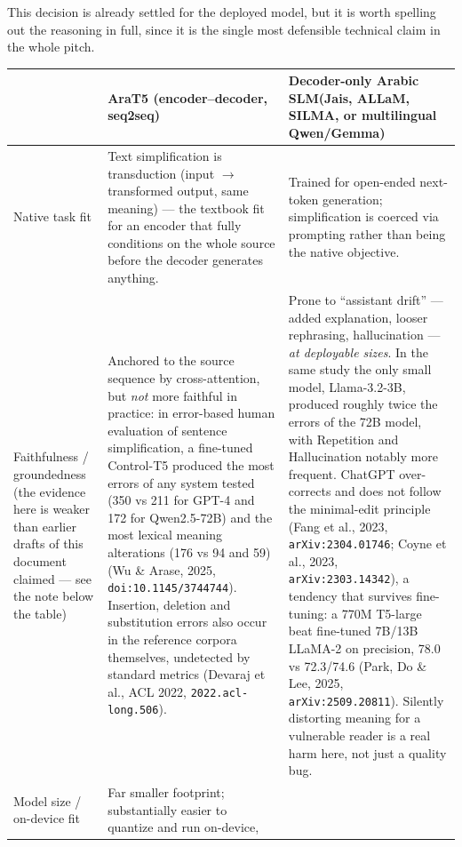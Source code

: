 \documentclass[11pt,a4paper]{article}
\begin{document}
This decision is already settled for the deployed model, but it is worth spelling
out the reasoning in full, since it is the single most defensible technical claim
in the whole pitch.

\begin{center}
\begin{tabular}{@{}p{4.6cm}p{5.6cm}p{5.6cm}@{}}
\toprule
& \textbf{AraT5 (encoder--decoder, seq2seq)} & \textbf{Decoder-only Arabic SLM}\newline\footnotesize(Jais, ALLaM, SILMA, or multilingual Qwen/Gemma) \\
\midrule
Native task fit &
Text simplification is transduction (input $\to$ transformed output, same
meaning) --- the textbook fit for an encoder that fully conditions on the
whole source before the decoder generates anything. &
Trained for open-ended next-token generation; simplification is coerced via
prompting rather than being the native objective. \\
\addlinespace
Faithfulness / groundedness
\newline\footnotesize(the evidence here is weaker than earlier drafts of this
document claimed --- see the note below the table) &
Anchored to the source sequence by cross-attention, but \emph{not} more
faithful in practice: in error-based human evaluation of sentence
simplification, a fine-tuned Control-T5 produced the most errors of any
system tested (350 vs 211 for GPT-4 and 172 for Qwen2.5-72B) and the most
lexical meaning alterations (176 vs 94 and 59) (Wu \& Arase, 2025,
\texttt{doi:10.1145/3744744}). Insertion, deletion and substitution errors
also occur in the reference corpora themselves, undetected by standard
metrics (Devaraj et al., ACL 2022, \texttt{2022.acl-long.506}). &
Prone to ``assistant drift'' --- added explanation, looser rephrasing,
hallucination --- \emph{at deployable sizes}. In the same study the only
small model, Llama-3.2-3B, produced roughly twice the errors of the 72B
model, with Repetition and Hallucination notably more frequent. ChatGPT
over-corrects and does not follow the minimal-edit principle (Fang et al.,
2023, \texttt{arXiv:2304.01746}; Coyne et al., 2023,
\texttt{arXiv:2303.14342}), a tendency that survives fine-tuning: a 770M
T5-large beat fine-tuned 7B/13B LLaMA-2 on precision, 78.0 vs 72.3/74.6
(Park, Do \& Lee, 2025, \texttt{arXiv:2509.20811}). Silently distorting
meaning for a vulnerable reader is a real harm here, not just a quality bug. \\
\addlinespace
Model size / on-device fit &
Far smaller footprint; substantially easier to quantize and run on-device,

\end{tabular}
\end{center}
\end{document}
